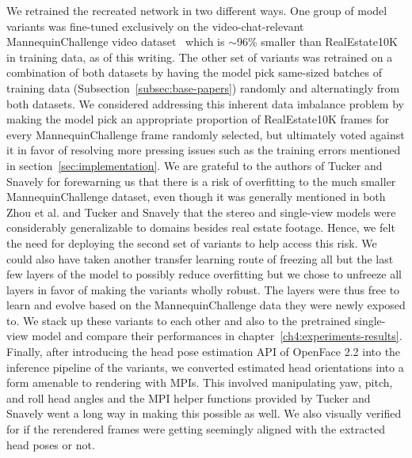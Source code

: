 We retrained the recreated network in two different ways. One group of model variants was fine-tuned exclusively on the video-chat-relevant MannequinChallenge video dataset~\cite{li2019learning} which is $\sim$96\% smaller than RealEstate10K in training data, as of this writing. The other set of variants was retrained on a combination of both datasets by having the model pick same-sized batches of training data (Subsection~\ref{subsec:base-papers}) randomly and alternatingly from both datasets. We considered addressing this inherent data imbalance problem by making the model pick an appropriate proportion of RealEstate10K frames for every MannequinChallenge frame randomly selected, but ultimately voted against it in favor of resolving more pressing issues such as the training errors mentioned in section~\ref{sec:implementation}. We are grateful to the authors of Tucker and Snavely for forewarning us that there is a risk of overfitting to the much smaller MannequinChallenge dataset, even though it was generally mentioned in both Zhou et al. and Tucker and Snavely that the stereo and single-view models were considerably generalizable to domains besides real estate footage. Hence, we felt the need for deploying the second set of variants to help access this risk. We could also have taken another transfer learning route of freezing all but the last few layers of the model to possibly reduce overfitting but we chose to unfreeze all layers in favor of making the variants wholly robust. The layers were thus free to learn and evolve based on the MannequinChallenge data they were newly exposed to. We stack up these variants to each other and also to the pretrained single-view model and compare their performances in chapter~\ref{ch4:experiments-results}. Finally, after introducing the head pose estimation API of OpenFace 2.2 into the inference pipeline of the variants, we converted estimated head orientations into a form amenable to rendering with MPIs. This involved manipulating yaw, pitch, and roll head angles and the MPI helper functions provided by Tucker and Snavely went a long way in making this possible as well. We also visually verified for if the rerendered frames were getting seemingly aligned with the extracted head poses or not.




